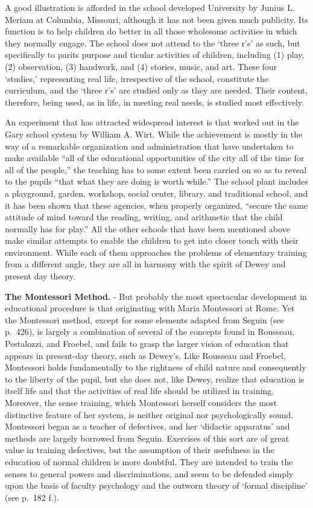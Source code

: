 \documentclass[]{book}
\begin{document}
A good illustration is afforded in the school developed University by Junius L. Meriam at Columbia, Missouri, although it has not been given much publicity. Its function is to help children do better in all those wholesome activities in which they normally engage. The school does not attend to the `three r's' as such, but specifically to parits purpose and ticular activities of children, including (1) play, (2) observation, (3) handwork, and (4) stories, music, and art. These four `studies,' representing real life, irrespective of the school, constitute the curriculum, and the `three r's' are studied only as they are needed. Their content, therefore, being used, as in life, in meeting real needs, is studied most effectively.

An experiment that has attracted widespread interest is that worked out in the Gary school system by William A. Wirt. While the achievement is mostly in the way of a remarkable organization and administration that have undertaken to make available ``all of the educational opportunities of the city all of the time for all of the people,'' the teaching has to some extent been carried on so as to reveal to the pupils ``that what they are doing is worth while.'' The school plant includes a playground, garden, workshop, social center, library, and traditional school, and it has been shown that these agencies, when properly organized, ``secure the same attitude of mind toward the reading, writing, and arithmetic that the child normally has for play.'' All the other schools that have been mentioned above make similar attempts to enable the children to get into closer touch with their environment. While each of them approaches the problems of elementary training from a different angle, they are all in harmony with the spirit of Dewey and present day theory.

\textbf{The Montessori Method.} - But probably the most spectacular development in educational procedure is that originating with Maria Montessori at Rome. Yet the Montessori method, except for some elements adapted from Seguin (see p.~426), is largely a combination of several of the concepts found in Rousseau, Pestalozzi, and Froebel, and fails to grasp the larger vision of education that appears in present-day theory, such as Dewey's. Like Rousseau and Froebel, Montessori holds fundamentally to the rightness of child nature and consequently to the liberty of the pupil, but she does not, like Dewey, realize that education is itself life and that the activities of real life should be utilized in training. Moreover, the sense training, which Montessori herself considers the most distinctive feature of her system, is neither original nor psychologically sound. Montessori began as a teacher of defectives, and her `didactic apparatus' and methods are largely borrowed from Seguin. Exercises of this sort are of great value in training defectives, but the assumption of their usefulness in the education of normal children is more doubtful. They are intended to train the senses to general powers and discriminations, and seem to be defended simply upon the basis of faculty psychology and the outworn theory of `formal discipline' (see p.~182 f.).
\end{document}
